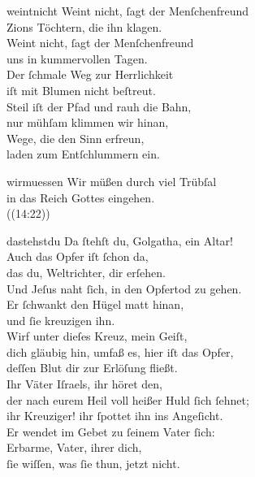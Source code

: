 \documentclass[shorttitlesize=55,tocstyle=ref-genre]{ees}
\begin{document}
{\begin{movement}{weintnicht}
  \voice[Tenore]
  Weint nicht, ſagt der Menſchenfreund\\
  Zions Töchtern, die ihn klagen.\\
  Weint nicht, ſagt der Menſchenfreund\\
  uns in kummervollen Tagen.\\
  Der ſchmale Weg zur Herrlichkeit\\
  iſt mit Blumen nicht beſtreut.\\
  Steil iſt der Pfad und rauh die Bahn,\\
  nur mühſam klimmen wir hinan,\\
  Wege, die den Sinn erfreun,\\
  laden zum Entſchlummern ein.
\end{movement}

\begin{movement}{wirmuessen}
  \voice[Coro]
  Wir müßen durch viel Trübſal\\
  in das Reich Gottes eingehen.\\
  ((14:22))
\end{movement}

\begin{movement}{dastehstdu}
  \voice[Alto]
  Da ſtehſt du, Golgatha, ein Altar!\\
  Auch das Opfer iſt ſchon da,\\
  das du, Weltrichter, dir erſehen.\\
  Und Jeſus naht ſich, in den Opfertod zu gehen.\\
  Er ſchwankt den Hügel matt hinan,\\
  und ſie kreuzigen ihn.\\
  Wirf unter dieſes Kreuz, mein Geiſt,\\
  dich gläubig hin, umfaß es, hier iſt das Opfer,\\
  deſſen Blut dir zur Erlöſung fließt.\\
  Ihr Väter Iſraels, ihr höret den,\\
  der nach eurem Heil voll heißer Huld ſich ſehnet;\\
  ihr Kreuziger! ihr ſpottet ihn ins Angeſicht.\\
  Er wendet im Gebet zu ſeinem Vater ſich:\\
  Erbarme, Vater, ihrer dich,\\
  ſie wiſſen, was ſie thun, jetzt nicht.
\end{movement}

}
\end{document}
